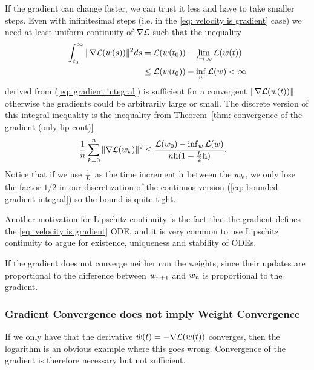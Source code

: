 If the gradient can change faster, we can trust it less and have to take smaller
steps. Even with infinitesimal steps (i.e. in the \ref{eq: velocity is
gradient} case) we need at least uniform continuity of \(\nabla\mathcal{L}\) such that
the inequality
\begin{align}\label{eq: bounded gradient integral}
	\int_{t_0}^\infty \|\nabla \mathcal{L}(w(s))\|^2 ds
	&= \mathcal{L}(w(t_0)) - \lim_{t\to\infty} \mathcal{L}(w(t)) \\
	&\le \mathcal{L}(w(t_0)) - \inf_{w} \mathcal{L}(w) < \infty \nonumber
\end{align}
%
derived from (\ref{eq: gradient integral}) is sufficient for a convergent
\(\|\nabla \mathcal{L}(w(t))\|\) otherwise the gradients could be arbitrarily
large or small. The discrete version of this integral inequality is the inequality
from Theorem~\ref{thm: convergence of the gradient (only lip cont)}
\begin{align*}
	\frac1{n}\sum_{k=0}^n \|\nabla\mathcal{L}(w_k)\|^2
	&\le \frac{\mathcal{L}(w_0) - \inf_{w}\mathcal{L}(w)}{n\text{h}(1-\tfrac{L}2\text{h})}.
\end{align*} 
Notice that if we use \(\tfrac{1}{L}\) as the time increment \(\text{h}\)
between the \(w_k\), we only lose the factor \(1/2\) in our
discretization of the continuos version (\ref{eq: bounded gradient integral}) so
the bound is quite tight.

Another motivation for Lipschitz continuity is the fact that the gradient defines
the \ref{eq: velocity is gradient} ODE, and it is very common to use Lipschitz
continuity to argue for existence, uniqueness and stability of ODEs.

If the gradient does not converge neither can the weights, since their updates
are proportional to the difference between \(w_{n+1}\) and \(w_n\)
is proportional to the gradient.

\subsubsection{Gradient Convergence does not imply Weight Convergence}

If we only have that the derivative \(\dot{w}(t) = -\nabla \mathcal{L}(w(t))\)
converges, then the logarithm is an obvious example where this goes wrong.
Convergence of the gradient is therefore necessary but not sufficient.

